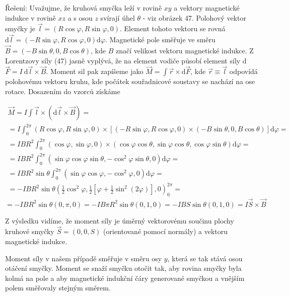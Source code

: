 \documentclass[czech,11pt,a4paper]{article}
\begin{document}
Řešení: Uvažujme, že kruhová smyčka leží v rovině $x y$ a vektory magnetické indukce v rovině $x z$ a s osou $z$ svírají úhel $\theta$ - viz obrázek 47. Polohový vektor smyčky je $\vec{l}=(R \cos \varphi, R \sin \varphi, 0)$. Element tohoto vektoru se rovná $\mathrm{d} \vec{l}=(-R \sin \varphi, R \cos \varphi, 0) \mathrm{d} \varphi$. Magnetické pole směřuje ve směru $\vec{B}=(-B \sin \theta, 0, B \cos \theta)$, kde $B$ značí velikost vektoru magnetické indukce. Z Lorentzovy síly (47) jasně vyplývá, že na element vodiče působí element síly d $\vec{F}=I \mathrm{~d} \vec{l} \times \vec{B}$. Moment sil pak zapíšeme jako $\vec{M}=\int \vec{r} \times \mathrm{d} \vec{F}$, kde $\vec{r} \equiv \vec{l}$ odpovídá polohovému vektoru kruhu, kde počátek souřadnicové soustavy se nachází na ose rotace. Dosazením do vzorců získáme

$$
\begin{gathered}
	\vec{M}=I \int \vec{l} \times(\mathrm{d} \vec{l} \times \vec{B})= \\
	=I \int_{0}^{2 \pi}(R \cos \varphi, R \sin \varphi, 0) \times[(-R \sin \varphi, R \cos \varphi, 0) \times(-B \sin \theta, 0, B \cos \theta)] \mathrm{d} \varphi= \\
	=I B R^{2} \int_{0}^{2 \pi}(\cos \varphi, \sin \varphi, 0) \times(\cos \varphi \cos \theta, \sin \varphi \cos \theta, \cos \varphi \sin \theta) \mathrm{d} \varphi= \\
	=I B R^{2} \int_{0}^{2 \pi}\left(\sin \varphi \cos \varphi \sin \theta,-\cos ^{2} \varphi \sin \theta, 0\right) \mathrm{d} \varphi= \\
	=I B R^{2} \sin \theta \int_{0}^{2 \pi}\left(\sin \varphi \cos \varphi,-\cos ^{2} \varphi, 0\right) \mathrm{d} \varphi= \\
	=-I B R^{2} \sin \theta\left(\frac{1}{2} \cos ^{2} \varphi, \frac{1}{2}\left[\varphi+\frac{1}{2} \sin ^{2}(2 \varphi)\right], 0\right)_{0}^{2 \pi}=
\end{gathered}
$$
$$
=-I B R^{2} \sin \theta(0, \pi, 0)=-I B \pi R^{2} \sin \theta(0,1,0)=-I B S \sin \theta(0,1,0)=I \vec{S} \times \vec{B}
$$

Z výsledku vidíme, že moment síly je úměrný vektorovému součinu plochy kruhové smyčky $\vec{S}=(0,0, S)$ (orientované pomocí normály) a vektoru magnetické indukce.

Moment síly v našem případě směřuje v směru osy $y$, která se tak stává osou otáčení smyčky. Moment se snaží smyčku otočit tak, aby rovina smyčky byla kolmá na pole a aby magnetické indukční čáry generované smyčkou a vnějším polem směřovaly stejným směrem.
\end{document}
